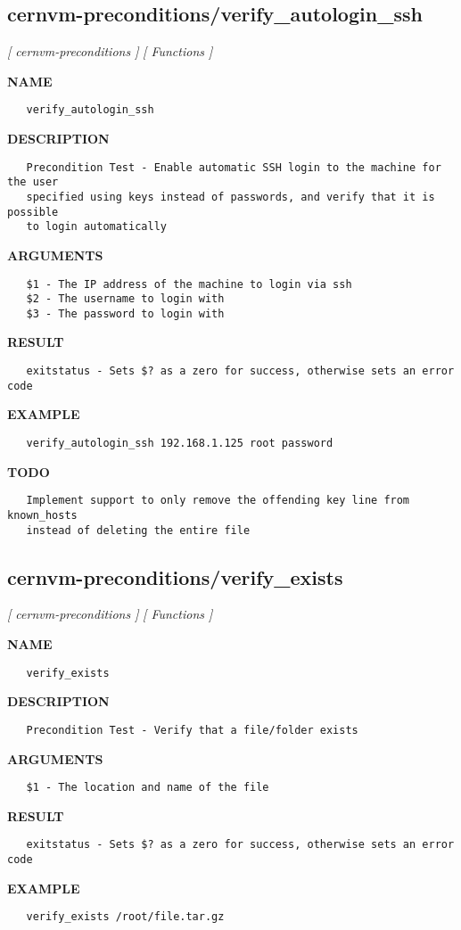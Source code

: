 \subsection{cernvm-preconditions/verify\_autologin\_ssh}
\textsl{[ cernvm-preconditions ]}
\textsl{[ Functions ]}

\label{ch:robo9}
\label{ch:cernvm_preconditions_verify_autologin_ssh}
\textbf{NAME}
\begin{verbatim}
   verify_autologin_ssh
\end{verbatim}
\textbf{DESCRIPTION}
\begin{verbatim}
   Precondition Test - Enable automatic SSH login to the machine for the user
   specified using keys instead of passwords, and verify that it is possible 
   to login automatically
\end{verbatim}
\textbf{ARGUMENTS}
\begin{verbatim}
   $1 - The IP address of the machine to login via ssh
   $2 - The username to login with
   $3 - The password to login with
\end{verbatim}
\textbf{RESULT}
\begin{verbatim}
   exitstatus - Sets $? as a zero for success, otherwise sets an error code
\end{verbatim}
\textbf{EXAMPLE}
\begin{verbatim}
   verify_autologin_ssh 192.168.1.125 root password
\end{verbatim}
\textbf{TODO}
\begin{verbatim}
   Implement support to only remove the offending key line from known_hosts
   instead of deleting the entire file
\end{verbatim}
\newpage
\subsection{cernvm-preconditions/verify\_exists}
\textsl{[ cernvm-preconditions ]}
\textsl{[ Functions ]}

\label{ch:robo10}
\label{ch:cernvm_preconditions_verify_exists}
\textbf{NAME}
\begin{verbatim}
   verify_exists
\end{verbatim}
\textbf{DESCRIPTION}
\begin{verbatim}
   Precondition Test - Verify that a file/folder exists
\end{verbatim}
\textbf{ARGUMENTS}
\begin{verbatim}
   $1 - The location and name of the file
\end{verbatim}
\textbf{RESULT}
\begin{verbatim}
   exitstatus - Sets $? as a zero for success, otherwise sets an error code
\end{verbatim}
\textbf{EXAMPLE}
\begin{verbatim}
   verify_exists /root/file.tar.gz
\end{verbatim}
\newpage
